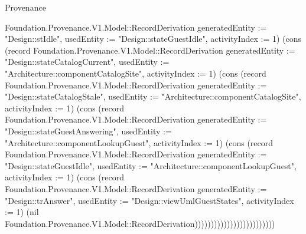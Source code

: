 \begin{lexlean}{Provenance}
\begin{semanticmodule}
{Foundation.Provenance.V1.Model::RecordDerivation {generatedEntity := "Design::stIdle", usedEntity := "Design::stateGuestIdle", activityIndex := 1}) (cons (record Foundation.Provenance.V1.Model::RecordDerivation {generatedEntity := "Design::stateCatalogCurrent", usedEntity := "Architecture::componentCatalogSite", activityIndex := 1}) (cons (record Foundation.Provenance.V1.Model::RecordDerivation {generatedEntity := "Design::stateCatalogStale", usedEntity := "Architecture::componentCatalogSite", activityIndex := 1}) (cons (record Foundation.Provenance.V1.Model::RecordDerivation {generatedEntity := "Design::stateGuestAnswering", usedEntity := "Architecture::componentLookupGuest", activityIndex := 1}) (cons (record Foundation.Provenance.V1.Model::RecordDerivation {generatedEntity := "Design::stateGuestIdle", usedEntity := "Architecture::componentLookupGuest", activityIndex := 1}) (cons (record Foundation.Provenance.V1.Model::RecordDerivation {generatedEntity := "Design::trAnswer", usedEntity := "Design::viewUmlGuestStates", activityIndex := 1}) (nil Foundation.Provenance.V1.Model::RecordDerivation)))))))))))))))))))))))))
}


\end{semanticmodule}
\end{lexlean}
